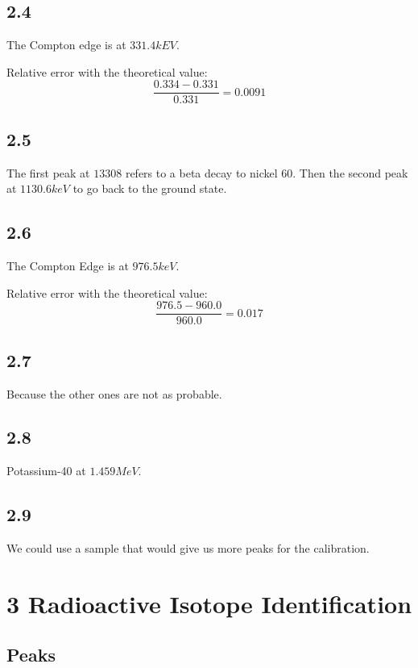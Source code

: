 \documentclass[a4paper,12pt]{article}
\begin{document}
\subsection{2.4}

The Compton edge is at $331.4 kEV$. 

Relative error with the theoretical value: $$ \frac{0.334-0.331}{0.331} = 0.0091 $$

\subsection{2.5}

The first peak at $ 13308 $ refers to a beta decay to nickel 60. Then the second peak at $1130.6 keV $ to go back to the ground state.

\subsection{2.6}

The Compton Edge is at $ 976.5 keV$. 

Relative error with the theoretical value: $$ \frac{976.5-960.0}{960.0} = 0.017 $$

\subsection{2.7}

Because the other ones are not as probable.

\subsection{2.8}

Potassium-40 at $1.459 MeV$.

\subsection{2.9}

We could use a sample that would give us more peaks for the calibration.

\section{3 Radioactive Isotope Identification}

\subsection{Peaks}
\end{document}
